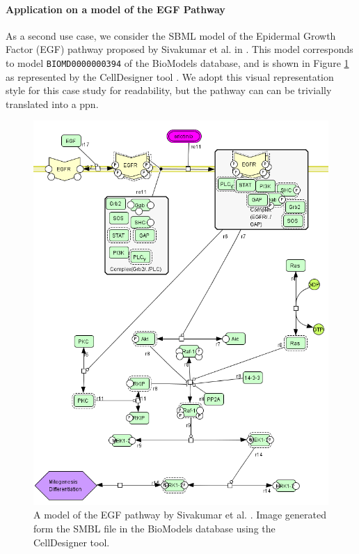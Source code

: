 \paragraph{Application on a model of the EGF Pathway}
As a second use case, we consider the SBML model of the Epidermal Growth Factor (EGF) pathway proposed by Sivakumar et al. in \citep{sivakumar2011systems}. This model corresponds to model \texttt{BIOMD0000000394} of the BioModels database, and is shown in Figure \ref{fig:EGF} as represented by the CellDesigner tool \citep{funahashi2003celldesigner}. We adopt this visual representation style for this case study for readability, but the pathway can can be trivially translated into a \gls{ppn}.
\begin{figure}[t]
    \centering
    \includegraphics[width=12cm]{Figures/Chapter5/pathway394}
\caption{A model of the EGF pathway by Sivakumar et al. \citep{sivakumar2011systems}. Image generated form the SMBL file in the BioModels database using the CellDesigner tool.}\label{fig:EGF}
\end{figure}
